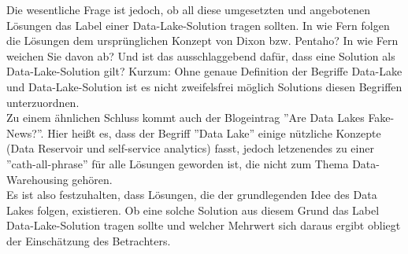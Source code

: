 \documentclass[twoside,twocolumn]{article}
\begin{document}
Die wesentliche Frage ist jedoch, ob all diese umgesetzten und angebotenen Lösungen das Label einer Data-Lake-Solution tragen sollten. In wie Fern folgen die Lösungen dem ursprünglichen Konzept von Dixon bzw. Pentaho? In wie Fern weichen Sie davon ab? Und ist das ausschlaggebend dafür, dass eine Solution als Data-Lake-Solution gilt? Kurzum: Ohne genaue Definition der Begriffe Data-Lake und Data-Lake-Solution ist es nicht zweifelsfrei möglich Solutions diesen Begriffen unterzuordnen.\\
Zu einem ähnlichen Schluss kommt auch der Blogeintrag ''Are Data Lakes Fake-News?''. Hier heißt es, dass der Begriff ''Data Lake'' einige nützliche Konzepte (Data Reservoir und self-service analytics) fasst, jedoch letzenendes zu einer ''cath-all-phrase'' für alle Lösungen geworden ist, die nicht zum Thema Data-Warehousing gehören.\cite{src4}\\

Es ist also festzuhalten, dass Lösungen, die der grundlegenden Idee des Data Lakes folgen, existieren. Ob eine solche Solution aus diesem Grund das Label Data-Lake-Solution tragen sollte und welcher Mehrwert sich daraus ergibt obliegt der Einschätzung des Betrachters.










\end{document}
